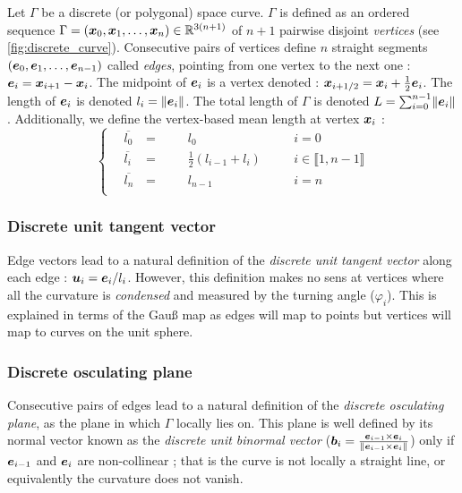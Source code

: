 Let $\Gamma$ be a discrete (or polygonal) space curve. $\Gamma$ is defined as an ordered sequence $\Gamma = (\boldsymbol{x}_0,  \boldsymbol{x}_1, \ldots, \boldsymbol{x}_n) \in \mathbb{R}^{3(n+1)}$ of $n+1$ pairwise disjoint \emph{vertices} (see \cref{fig:discrete_curve}). Consecutive pairs of vertices define $n$ straight segments $(\boldsymbol{e}_0,  \boldsymbol{e}_1, \ldots, \boldsymbol{e}_{n-1})$ called \emph{edges}, pointing from one vertex to the next one : $\boldsymbol{e}_i = \boldsymbol{x}_{i+1} - \boldsymbol{x}_{i}$. The midpoint of $\boldsymbol{e}_i$ is a vertex denoted : $\boldsymbol{x}_{i+1/2} = \boldsymbol{x}_{i} + \frac{1}{2}\boldsymbol{e}_{i}$. The length of $\boldsymbol{e}_i$ is denoted $l_i = \lVert\boldsymbol{e}_i\rVert$. The total length of $\Gamma$ is denoted $L = \sum_{i=0}^{n-1} \lVert\boldsymbol{e}_i\rVert$. Additionally, we define the vertex-based mean length at vertex $\boldsymbol{x}_i$ : 
\begin{equation}
	\left\{
	\begin{alignedat}{4}
		\,	&\overbar{l_0} 		& = &\,	&& l_0					&\quad 	&i = 0		\\
			&\overbar{l_i}		& = &	&& \frac{1}{2}(l_{i-1} + l_i)		&		&i \in \llbracket 1, n-1 \rrbracket	\\
			&\overbar{l_n} 	\,	& = &	&& l_{n-1} 				&		&i = n		\\
	\end{alignedat}
	\right.
\end{equation}

\subsubsection{Discrete unit tangent vector}\label{sec:tangent_edge}
Edge vectors lead to a natural definition of the \emph{discrete unit tangent vector} along each edge : $\boldsymbol{u}_i = \boldsymbol{e}_i / l_i$. However, this definition makes no sens at vertices where all the curvature is \emph{condensed} and measured by the turning angle ($\varphi_i$). This is explained in terms of the Gau{\ss} map as edges will map to points but vertices will map to curves on the unit sphere.

\subsubsection{Discrete osculating plane}
Consecutive pairs of edges lead to a natural definition of the \emph{discrete osculating plane}, as the plane in which $\Gamma$ locally lies on. This plane is well defined by its normal vector known as the \emph{discrete unit binormal vector} ($\boldsymbol{b}_i = \frac{\boldsymbol{e}_{i-1} \times \boldsymbol{e}_{i}}{\lVert\boldsymbol{e}_{i-1} \times \boldsymbol{e}_{i}\rVert}$) only if $\boldsymbol{e}_{i-1}$ and $\boldsymbol{e}_{i}$ are non-collinear ; that is the curve is not locally a straight line, or equivalently the curvature does not vanish.

